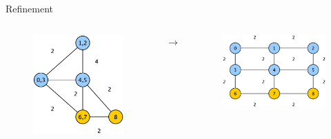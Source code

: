 \documentclass{beamer}
\begin{document}
\begin{frame}{Refinement}
  
  \begin{columns}[c]
    \scriptsize
    \begin{center}
      \begin{figure}[htbp]
        \includegraphics[scale=.15]{img/partition.eps}
      \end{figure}
    \end{center}

    \begin{center}
      $\longrightarrow$  
    \end{center}    
    
    \begin{center}
      \begin{figure}[htbp]
        \includegraphics[scale=.15]{img/refinement.eps}
      \end{figure}
    \end{center}


\end{columns}
\end{frame}
\end{document}
